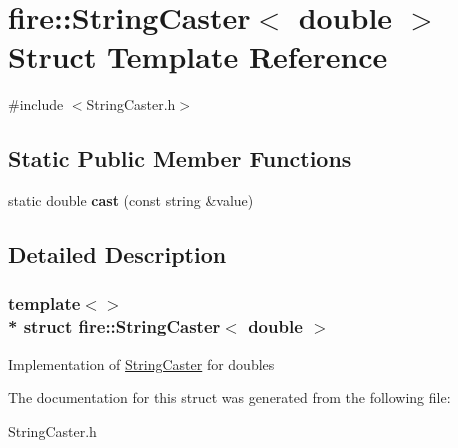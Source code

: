 \hypertarget{a00031}{}\section{fire\+:\+:String\+Caster$<$ double $>$ Struct Template Reference}
\label{a00031}


{\ttfamily \#include $<$String\+Caster.\+h$>$}

\subsection*{Static Public Member Functions}
\begin{DoxyCompactItemize}
\item 
static double {\bfseries cast} (const string \&value)\hypertarget{a00031_a19d0552b656a96820deb3b8db8504340}{}\label{a00031_a19d0552b656a96820deb3b8db8504340}

\end{DoxyCompactItemize}


\subsection{Detailed Description}
\subsubsection*{template$<$$>$\\*
struct fire\+::\+String\+Caster$<$ double $>$}

Implementation of \hyperlink{a00029}{String\+Caster} for doubles 

The documentation for this struct was generated from the following file\+:\begin{DoxyCompactItemize}
\item 
String\+Caster.\+h\end{DoxyCompactItemize}
